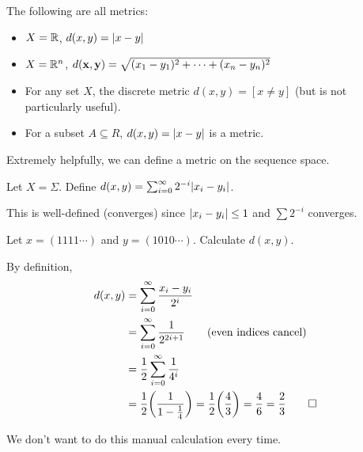 \documentclass[class=pmath370,tikz,notes]{agony}
\begin{document}
\begin{example}
  The following are all metrics:
  \begin{itemize}
    \item $X = \mathbb{R}$, $d(x,y) = \abs{x-y}$
    \item $X = \mathbb{R}^n$, $d(\vb x, \vb y) = \sqrt{(x_1-y_1)^2 + \dotsb + (x_n-y_n)^2}$
    \item For any set $X$, the discrete metric $d(x,y) = [x\neq y]$
          (but is not particularly useful).
    \item For a subset $A \subseteq R$, $d(x,y) = \abs{x-y}$ is a metric.
  \end{itemize}
\end{example}

Extremely helpfully, we can define a metric on the sequence space.

\begin{defn}
  Let $X = \Sigma$.
  Define $d(x,y) = \sum_{i=0}^\infty 2^{-i}\abs{x_i-y_i}$.

  This is well-defined (converges) since $\abs{x_i-y_i} \leq 1$ and $\sum 2^{-i}$ converges.
\end{defn}

\begin{example}
  Let $x = (1111\cdots)$ and $y = (1010\cdots)$.
  Calculate $d(x,y)$.
\end{example}
\begin{sol}
  By definition,
  \begin{align*}
    d(x,y) & = \sum_{i=0}^\infty \frac{x_i-y_i}{2^i}                                                \\
           & = \sum_{i=0}^\infty \frac{1}{2^{2i+1}} \tag{even indices cancel}                       \\
           & = \frac12\sum_{i=0}^\infty \frac{1}{4^i}                                               \\
           & = \frac12\qty(\frac{1}{1-\frac14}) = \frac12\qty(\frac43) = \frac46 = \frac23 \qedhere
  \end{align*}
\end{sol}

We don't want to do this manual calculation every time.
\end{document}
